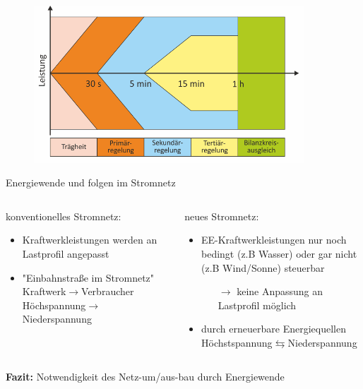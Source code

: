 \documentclass[aspectratio=1610, professionalfonts, 9pt]{beamer}
\begin{document}
{
\begin{frame}
  \begin{figure}
  \includegraphics[width=0.9\textwidth]{images/Regelleistung.png}
\end{figure}
\end{frame}
}

\begin{frame}{Energiewende und folgen im Stromnetz}
  \begin{columns}
  \begin{column}{0.5\textwidth}
konventionelles Stromnetz:
\begin{itemize}
  \item Kraftwerkleistungen werden an Lastprofil angepasst
  \item "Einbahnstraße im Stromnetz" Kraftwerk$\rightarrow$Verbraucher
Höchspannung$\rightarrow$Niederspannung
\end{itemize}
  \end{column}
  \begin{column}{0.5\textwidth}
neues Stromnetz:
\begin{itemize}
\item EE-Kraftwerkleistungen nur noch bedingt (z.B Wasser) oder gar nicht (z.B Wind/Sonne) steuerbar
\begin{itemize}
  \item[$\rightarrow$] keine Anpassung an Lastprofil möglich
\end{itemize}
\item durch erneuerbare Energiequellen  Höchstspannung$\leftrightarrows$Niederspannung
\end{itemize}
\end{column}
\end{columns}
\textbf{\textcolor{tugreen}{Fazit:}} Notwendigkeit des Netz-um/aus-bau durch Energiewende
\end{frame}
\end{document}
